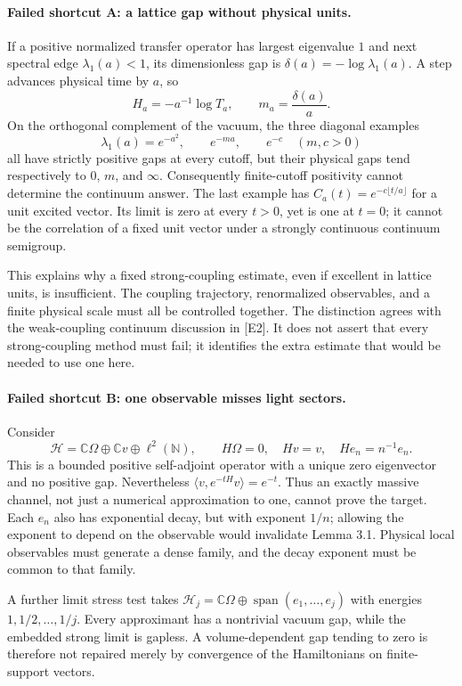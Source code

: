 \documentclass[11pt]{article}
\begin{document}
\paragraph{Failed shortcut A: a lattice gap without physical units.}
If a positive normalized transfer operator has largest eigenvalue $1$ and
 next spectral edge $\lambda_1(a)<1$, its dimensionless gap is
 $\delta(a)=-\log\lambda_1(a)$. A step advances physical time by $a$, so
\[
 H_a=-a^{-1}\log T_a,\qquad m_a=\frac{\delta(a)}a.
\]
On the orthogonal complement of the vacuum, the three diagonal examples
\[
 \lambda_1(a)=e^{-a^2},\qquad e^{-ma},\qquad e^{-c}
 \quad(m,c>0)
\]
all have strictly positive gaps at every cutoff, but their physical gaps
 tend respectively to $0$, $m$, and $\infty$. Consequently finite-cutoff
 positivity cannot determine the continuum answer. The last example has
 $C_a(t)=e^{-c\lfloor t/a\rfloor}$ for a unit excited vector. Its limit is
 zero at every $t>0$, yet is one at $t=0$; it cannot be the correlation of a
 fixed unit vector under a strongly continuous continuum semigroup.

This explains why a fixed strong-coupling estimate, even if excellent in
 lattice units, is insufficient. The coupling trajectory, renormalized
 observables, and a finite physical scale must all be controlled together.
 The distinction agrees with the weak-coupling continuum discussion in [E2].
 It does not assert that every strong-coupling method must fail; it identifies
 the extra estimate that would be needed to use one here.

\paragraph{Failed shortcut B: one observable misses light sectors.}
Consider
\[
 \mathcal H=\mathbb C\Omega\oplus\mathbb Cv
       \oplus\ell^2(\mathbb N),\qquad
 H\Omega=0,\quad Hv=v,\quad He_n=n^{-1}e_n.
\]
This is a bounded positive self-adjoint operator with a unique zero
 eigenvector and no positive gap. Nevertheless
 $\langle v,e^{-tH}v\rangle=e^{-t}$. Thus an exactly massive channel, not
 just a numerical approximation to one, cannot prove the target. Each
 $e_n$ also has exponential decay, but with exponent $1/n$; allowing the
 exponent to depend on the observable would invalidate Lemma 3.1. Physical
 local observables must generate a dense family, and the decay exponent must
 be common to that family.

A further limit stress test takes
 $\mathcal H_j=\mathbb C\Omega\oplus\operatorname{span}(e_1,\ldots,e_j)$
 with energies $1,1/2,\ldots,1/j$. Every approximant has a nontrivial vacuum
 gap, while the embedded strong limit is gapless. A volume-dependent gap
 tending to zero is therefore not repaired merely by convergence of the
 Hamiltonians on finite-support vectors.
\end{document}
